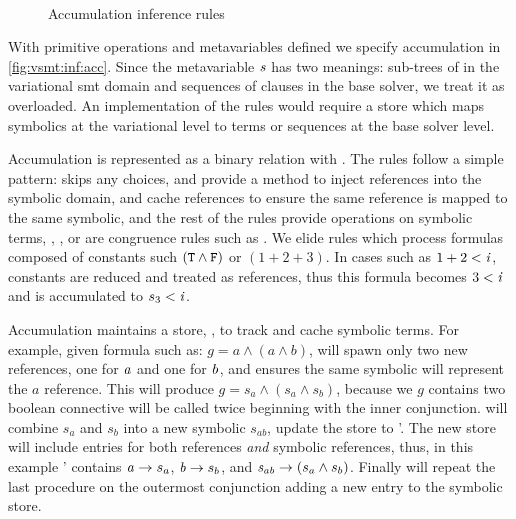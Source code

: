 ~\label{section:vsmt:accumulation}
%
\begin{figure}
  
  \caption{Accumulation inference rules}%
  \label{fig:vsmt:inf:acc}
\end{figure}
%
%
With primitive operations and metavariables defined we specify accumulation in
\autoref{fig:vsmt:inf:acc}. Since the metavariable $\mathit{s}$ has two meanings:
sub-trees of  in the variational \ac{smt} domain and sequences of
clauses in the base solver, we treat it as overloaded.
%
%
An implementation of the rules would require a store which maps symbolics at
the variational level to terms or sequences at the base solver level.

Accumulation is represented as a binary relation with \accumulation{}. The rules
follow a simple pattern:  skips any choices,  and
 provide a method to inject references into the symbolic domain,
 and  cache references to ensure the same
reference is mapped to the same symbolic, and the rest of the rules provide
operations on symbolic terms, \eg{}, , or are congruence rules
such as . We elide rules which process formulas composed of
constants such $\mathit{(\texttt{T}{} \wedge \texttt{F}{})}$ or $(1 + 2 + 3)$. In cases such as
$1 + 2 < \mathit{i}$, constants are reduced and treated as references, thus this
formula becomes $3 < \mathit{i}$ and is accumulated to $s_{3} < \mathit{i}$.

Accumulation maintains a store, \aStore{}, to track and cache symbolic terms.
For example, given formula such as: $g = a \wedge (a \wedge b)$, 
will spawn only two new references, one for $\mathit{a}$ and one for $\mathit{b}$, and
 ensures the same symbolic will represent the $a$ reference. This
will produce $g = s_{a} \wedge (s_{a} \wedge s_{b})$, because we $g$ contains
two boolean connective  will be called twice beginning with the
inner conjunction.  will combine $s_{a}$ and $s_{b}$ into a new
symbolic $s_{ab}$, update the store to \aStore{}'. The new store will include
entries for both references \textit{and} symbolic references, thus, in this
example \aStore{}' contains $\mathit{a} \rightarrow s_{a}$, $\mathit{b} \rightarrow
s_{b}$, and $\mathit{s_{ab}} \rightarrow (s_{a} \wedge s_{b})$. Finally
 will repeat the last procedure on the outermost conjunction
adding a new entry to the symbolic store.


